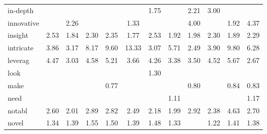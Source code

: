 \begin{tabular}{|l|c|c|c|c|c|c|c|c|c|c|c|}
in-depth &  &  &  &  &  & \cellcolor{yellow!35} 1.75 &  & \cellcolor{yellow!44} 2.21 & \cellcolor{yellow!60} 3.00 &  &  \\
innovative &  & \cellcolor{yellow!45} 2.26 &  &  & \cellcolor{yellow!26} 1.33 &  &  & \cellcolor{yellow!80} 4.00 &  & \cellcolor{yellow!38} 1.92 & \cellcolor{yellow!87} 4.37 \\
insight & \cellcolor{yellow!50} 2.53 & \cellcolor{yellow!36} 1.84 & \cellcolor{yellow!46} 2.30 & \cellcolor{yellow!47} 2.35 & \cellcolor{yellow!35} 1.77 & \cellcolor{yellow!50} 2.53 & \cellcolor{yellow!38} 1.92 & \cellcolor{yellow!39} 1.98 & \cellcolor{yellow!46} 2.30 & \cellcolor{yellow!37} 1.89 & \cellcolor{yellow!45} 2.29 \\
intricate & \cellcolor{yellow!77} 3.86 & \cellcolor{yellow!63} 3.17 & \cellcolor{yellow!100} 8.17 & \cellcolor{yellow!100} 9.60 & \cellcolor{yellow!100} 13.33 & \cellcolor{yellow!61} 3.07 & \cellcolor{yellow!100} 5.71 & \cellcolor{yellow!49} 2.49 & \cellcolor{yellow!78} 3.90 & \cellcolor{yellow!100} 9.80 & \cellcolor{yellow!100} 6.28 \\
leverag & \cellcolor{yellow!89} 4.47 & \cellcolor{yellow!60} 3.03 & \cellcolor{yellow!91} 4.58 & \cellcolor{yellow!100} 5.21 & \cellcolor{yellow!73} 3.66 & \cellcolor{yellow!85} 4.26 & \cellcolor{yellow!67} 3.38 & \cellcolor{yellow!70} 3.50 & \cellcolor{yellow!90} 4.52 & \cellcolor{yellow!100} 5.67 & \cellcolor{yellow!53} 2.67 \\
look &  &  &  &  &  & \cellcolor{yellow!26} 1.30 &  &  &  &  &  \\
make &  &  &  & \cellcolor{yellow!15} 0.77 &  &  &  & \cellcolor{yellow!16} 0.80 &  & \cellcolor{yellow!16} 0.84 & \cellcolor{yellow!16} 0.83 \\
need &  &  &  &  &  &  & \cellcolor{yellow!22} 1.11 &  &  &  & \cellcolor{yellow!23} 1.17 \\
notabl & \cellcolor{yellow!52} 2.60 & \cellcolor{yellow!40} 2.01 & \cellcolor{yellow!57} 2.89 & \cellcolor{yellow!56} 2.82 & \cellcolor{yellow!49} 2.49 & \cellcolor{yellow!43} 2.18 & \cellcolor{yellow!39} 1.99 & \cellcolor{yellow!58} 2.92 & \cellcolor{yellow!47} 2.38 & \cellcolor{yellow!92} 4.63 & \cellcolor{yellow!54} 2.70 \\
novel & \cellcolor{yellow!26} 1.34 & \cellcolor{yellow!27} 1.39 & \cellcolor{yellow!31} 1.55 & \cellcolor{yellow!30} 1.50 & \cellcolor{yellow!27} 1.39 & \cellcolor{yellow!29} 1.48 & \cellcolor{yellow!26} 1.33 &  & \cellcolor{yellow!24} 1.22 & \cellcolor{yellow!28} 1.41 & \cellcolor{yellow!27} 1.38 \\

\end{tabular}

